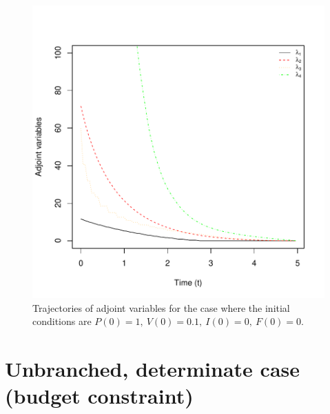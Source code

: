 \documentclass[12pt, oneside]{article}   	%
\begin{document}
 \begin{figure}[h]
        \centering
       \includegraphics[width=\linewidth]{../../figures/unbranched-determinate-adjoints}  
        \caption{Trajectories of adjoint variables for the case where the initial conditions are $P(0)=1,\ V(0)=0.1,\ I(0)=0,\ F(0)=0$.} \label{fig:...}
\end{figure}

\clearpage
\newpage

\section*{Unbranched, determinate case (budget constraint)}
\end{document}
